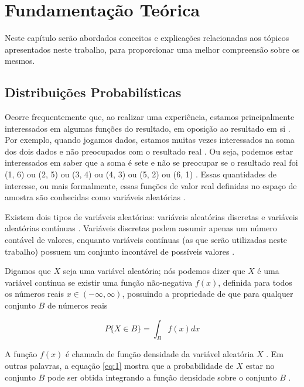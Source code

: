 \setlength\abovedisplayskip{0pt} \setlength\belowdisplayskip{0pt}
\setlength\abovedisplayshortskip{0pt} \setlength\belowdisplayshortskip{0pt}

\chapter{Fundamentação Teórica} \label{cap1}
Neste capítulo serão abordados conceitos e explicações relacionadas aos tópicos apresentados neste trabalho, para proporcionar uma melhor compreensão sobre os mesmos.

\section{Distribuições Probabilísticas}

Ocorre frequentemente que, ao realizar uma experiência, estamos principalmente interessados em algumas funções do resultado, em oposição ao resultado em si \cite{ross}. Por exemplo, quando jogamos dados, estamos muitas vezes interessados na soma dos dois dados e não preocupados com o resultado real \cite{ross}. Ou seja, podemos estar interessados em saber que a soma é sete e não se preocupar se o resultado real foi (1, 6) ou (2, 5) ou (3, 4) ou (4, 3) ou (5, 2) ou (6, 1) \cite{ross}. Essas quantidades de interesse, ou mais formalmente, essas funções de valor real definidas no espaço de amostra são conhecidas como variáveis aleatórias \cite{ross}.

Existem dois tipos de variáveis aleatórias: variáveis aleatórias discretas e variáveis aleatórias contínuas \cite{ross}. Variáveis discretas podem assumir apenas um número contável de valores, enquanto variáveis contínuas (as que serão utilizadas neste trabalho) possuem um conjunto incontável de possíveis valores \cite{ross}.

Digamos que $X$ seja uma variável aleatória; nós podemos dizer que $X$ é uma variável contínua se existir uma função não-negativa $f(x)$, definida para todos os números reais $x \in (-\infty, \infty)$, possuindo a propriedade de que para qualquer conjunto $B$ de números reais \cite{ross}

\begin{equation}
\label{eq:1}
    P\{X \in B\} = \int_{B} f(x) dx
\end{equation}

A função $f(x)$ é chamada de função densidade da variável aleatória $X$ \cite{ross}. Em outras palavras, a equação \ref{eq:1} mostra que a probabilidade de $X$ estar no conjunto $B$ pode ser obtida integrando a função densidade sobre o conjunto $B$ \cite{ross}.

